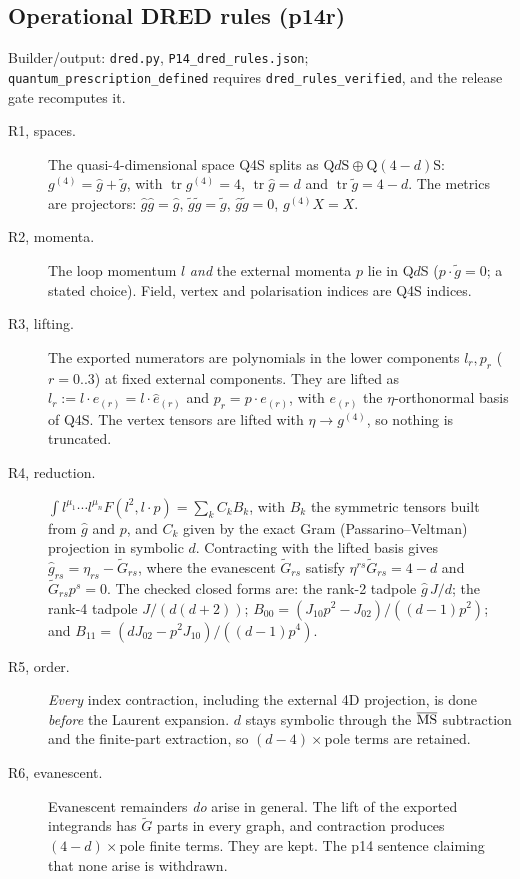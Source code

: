 \subsection{Operational DRED rules (p14r)}\label{sec:p14r-dred}
\noindent Builder/output: \texttt{dred.py}, \texttt{P14\_dred\_rules.json}; \texttt{quantum\_prescription\_defined}
requires \texttt{dred\_rules\_verified}, and the release gate recomputes it.\par\smallskip
\begin{description}
\item[R1, spaces.] The quasi-4-dimensional space Q4S splits as $\mathrm{Q}d\mathrm{S}\oplus\mathrm{Q}(4{-}d)\mathrm{S}$:
$g^{(4)}=\hat g+\tilde g$, with $\operatorname{tr}g^{(4)}=4$, $\operatorname{tr}\hat g=d$ and $\operatorname{tr}\tilde g=4-d$.
The metrics are projectors: $\hat g\hat g=\hat g$, $\tilde g\tilde g=\tilde g$, $\hat g\tilde g=0$, $g^{(4)}X=X$.
\item[R2, momenta.] The loop momentum $l$ \emph{and} the external momenta $p$ lie in Q$d$S ($p\cdot\tilde g=0$; a stated
choice). Field, vertex and polarisation indices are Q4S indices.
\item[R3, lifting.] The exported numerators are polynomials in the lower components $l_r,p_r$ ($r=0..3$) at fixed external
components. They are lifted as $l_r:=l\cdot e_{(r)}=l\cdot\hat e_{(r)}$ and $p_r=p\cdot e_{(r)}$, with $e_{(r)}$ the
$\eta$-orthonormal basis of Q4S. The vertex tensors are lifted with $\eta\to g^{(4)}$, so nothing is truncated.
\item[R4, reduction.] $\int l^{\mu_1}\cdots l^{\mu_n}F(l^2,l\cdot p)=\sum_kC_kB_k$, with $B_k$ the symmetric tensors built
from $\hat g$ and $p$, and $C_k$ given by the exact Gram (Passarino--Veltman) projection in symbolic $d$. Contracting with
the lifted basis gives $\hat g_{rs}=\eta_{rs}-\tilde G_{rs}$, where the evanescent $\tilde G_{rs}$ satisfy
$\eta^{rs}\tilde G_{rs}=4-d$ and $\tilde G_{rs}p^s=0$. The checked closed forms are:
the rank-2 tadpole $\hat g\,J/d$; the rank-4 tadpole $J/(d(d+2))$;
$B_{00}=(J_{10}p^2-J_{02})/((d-1)p^2)$; and $B_{11}=(dJ_{02}-p^2J_{10})/((d-1)p^4)$.
\item[R5, order.] \emph{Every} index contraction, including the external 4D projection, is done \emph{before} the
Laurent expansion. $d$ stays symbolic through the $\overline{\rm MS}$ subtraction and the finite-part extraction, so
$(d-4)\times$pole terms are retained.
\item[R6, evanescent.] Evanescent remainders \emph{do} arise in general. The lift of the exported integrands has
$\tilde G$ parts in every graph, and contraction produces $(4-d)\times$pole finite terms. They are kept. The p14 sentence
claiming that none arise is withdrawn.
\end{description}
